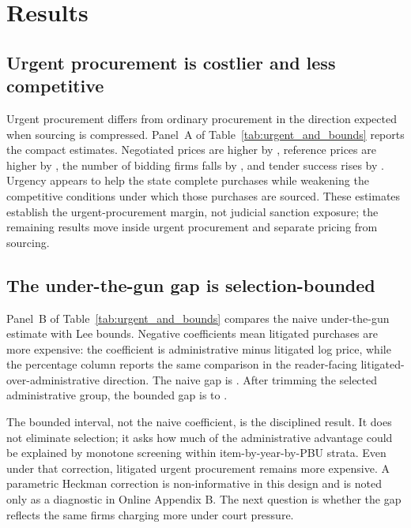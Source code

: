 \section{Results}
\label{sec:results}

\subsection{Urgent procurement is costlier and less competitive}
\label{subsec:urgent_results}

Urgent procurement differs from ordinary procurement in the direction expected when sourcing is compressed. Panel~A of Table~\ref{tab:urgent_and_bounds} reports the compact estimates. Negotiated prices are higher by \BPnegPctHeadline{}, reference prices are higher by \BPrefPctPreferred{}, the number of bidding firms falls by \BPfirmsPctHeadlineAbs{}, and tender success rises by \BPsuccessPP{}. Urgency appears to help the state complete purchases while weakening the competitive conditions under which those purchases are sourced. These estimates establish the urgent-procurement margin, not judicial sanction exposure; the remaining results move inside urgent procurement and separate pricing from sourcing.



\subsection{The under-the-gun gap is selection-bounded}
\label{subsec:utg_bounds}

Panel~B of Table~\ref{tab:urgent_and_bounds} compares the naive under-the-gun estimate with Lee bounds. Negative coefficients mean litigated purchases are more expensive: the coefficient is administrative minus litigated log price, while the percentage column reports the same comparison in the reader-facing litigated-over-administrative direction. The naive gap is \BPutgPointNaive{}. After trimming the selected administrative group, the bounded gap is \BPutgBoundLow{} to \BPutgBoundHigh{}.

The bounded interval, not the naive coefficient, is the disciplined result. It does not eliminate selection; it asks how much of the administrative advantage could be explained by monotone screening within item-by-year-by-PBU strata. Even under that correction, litigated urgent procurement remains more expensive. A parametric Heckman correction is non-informative in this design and is noted only as a diagnostic in Online Appendix B. The next question is whether the gap reflects the same firms charging more under court pressure.

